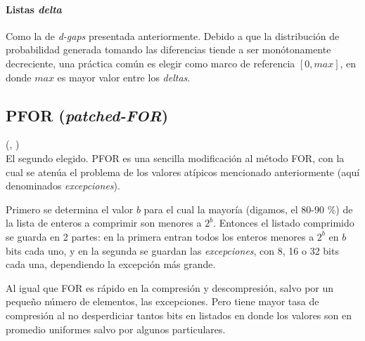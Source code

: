 




\paragraph{Listas \textit{delta}}Como la de \textit{d-gaps} presentada anteriormente. Debido a que la distribución de probabilidad generada tomando las diferencias tiende a ser monótonamente decreciente, una práctica común es elegir como marco de referencia $[0, max]$, en donde $max$ es mayor valor entre los \textit{deltas}. 


\subsection{PFOR (\textit{patched-FOR})}

(\noindent \citeauthor{Zukowski:2006}, \citeyear{Zukowski:2006})
\\

El segundo elegido. PFOR es una sencilla modificación al método FOR, con la cual se atenúa el problema de los valores atípicos mencionado anteriormente (aquí denominados \textit{excepciones}). 


Primero se determina el valor $b$ para el cual la mayoría (digamos, el 80-90 \%) de la lista de enteros a comprimir son menores a $2^b$. Entonces el listado comprimido se guarda en 2 partes: en la primera entran todos los enteros menores a $2^b$ en $b$ bits cada uno, y en la segunda se guardan las \textit{excepciones}, con 8, 16 o 32 bits cada una, dependiendo la excepción más grande.

Al igual que FOR es rápido en la compresión y descompresión, salvo por un pequeño número de elementos, las excepciones. Pero tiene mayor tasa de compresión al no desperdiciar tantos bits en listados en donde los valores son en promedio uniformes salvo por algunos particulares.

